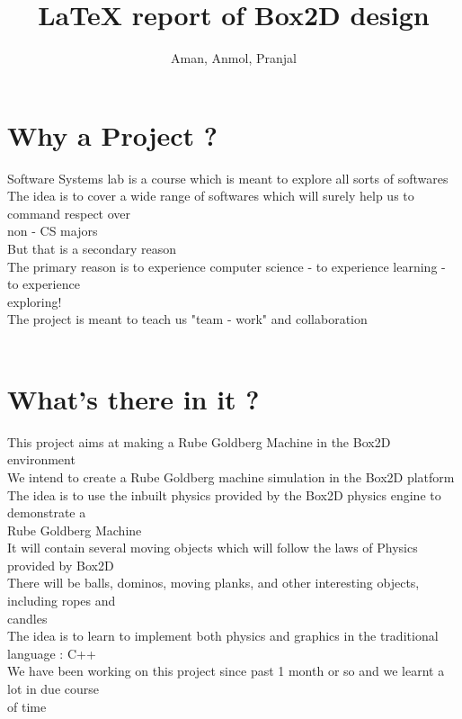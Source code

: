 \documentclass{article}
\title{LaTeX report of Box2D design}
\author{Aman, Anmol, Pranjal}
\begin{document}
\maketitle
\section{Why a Project ?}
\hspace*{5 mm}Software Systems lab is a course which is meant to explore all sorts of softwares \\
\hspace*{5 mm}The idea is to cover a wide range of softwares which will surely help us to command respect over  \\
\hspace*{5 mm}non - CS majors \\
\hspace*{5 mm}But that is a secondary reason \\
\hspace*{5 mm}The primary reason is to experience computer science - to experience learning - to experience \\
\hspace*{5 mm}exploring! \\
\hspace*{5 mm}The project is meant to teach us "team - work" and collaboration \\
\hspace*{5 mm}\\
\section{What's there in it ?}
\hspace*{5 mm}This project aims at making a Rube Goldberg Machine in the Box2D environment \\
\hspace*{5 mm}We intend to create a Rube Goldberg machine simulation in the Box2D platform \\
\hspace*{5 mm}The idea is to use the inbuilt physics provided by the Box2D physics engine to demonstrate a \\
\hspace*{5 mm}Rube Goldberg Machine \\
\hspace*{5 mm}It will contain several moving objects which will follow the laws of Physics provided by Box2D \\
\hspace*{5 mm}There will be balls, dominos, moving planks, and other interesting objects, including ropes and \\
\hspace*{5 mm}candles \\
\hspace*{5 mm}The idea is to learn to implement both physics and graphics in the traditional language : C++ \\
\hspace*{5 mm}We have been working on this project since past 1 month or so and we learnt a lot in due course \\
\hspace*{5 mm}of time \\
\end{document}
